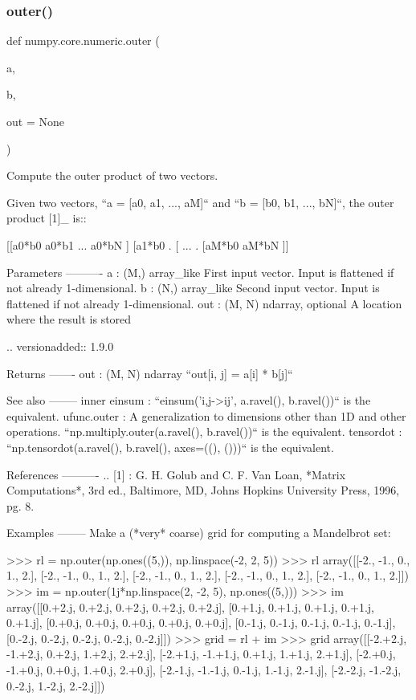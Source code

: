\subsubsection{\texorpdfstring{outer()}{outer()}}
{\footnotesize\ttfamily def numpy.\+core.\+numeric.\+outer (\begin{DoxyParamCaption}\item[{}]{a,  }\item[{}]{b,  }\item[{}]{out = {\ttfamily None} }\end{DoxyParamCaption})}

\begin{DoxyVerb}Compute the outer product of two vectors.

Given two vectors, ``a = [a0, a1, ..., aM]`` and
``b = [b0, b1, ..., bN]``,
the outer product [1]_ is::

  [[a0*b0  a0*b1 ... a0*bN ]
   [a1*b0    .
   [ ...          .
   [aM*b0            aM*bN ]]

Parameters
----------
a : (M,) array_like
    First input vector.  Input is flattened if
    not already 1-dimensional.
b : (N,) array_like
    Second input vector.  Input is flattened if
    not already 1-dimensional.
out : (M, N) ndarray, optional
    A location where the result is stored

    .. versionadded:: 1.9.0

Returns
-------
out : (M, N) ndarray
    ``out[i, j] = a[i] * b[j]``

See also
--------
inner
einsum : ``einsum('i,j->ij', a.ravel(), b.ravel())`` is the equivalent.
ufunc.outer : A generalization to dimensions other than 1D and other
              operations. ``np.multiply.outer(a.ravel(), b.ravel())``
              is the equivalent.
tensordot : ``np.tensordot(a.ravel(), b.ravel(), axes=((), ()))``
            is the equivalent.

References
----------
.. [1] : G. H. Golub and C. F. Van Loan, *Matrix Computations*, 3rd
         ed., Baltimore, MD, Johns Hopkins University Press, 1996,
         pg. 8.

Examples
--------
Make a (*very* coarse) grid for computing a Mandelbrot set:

>>> rl = np.outer(np.ones((5,)), np.linspace(-2, 2, 5))
>>> rl
array([[-2., -1.,  0.,  1.,  2.],
       [-2., -1.,  0.,  1.,  2.],
       [-2., -1.,  0.,  1.,  2.],
       [-2., -1.,  0.,  1.,  2.],
       [-2., -1.,  0.,  1.,  2.]])
>>> im = np.outer(1j*np.linspace(2, -2, 5), np.ones((5,)))
>>> im
array([[0.+2.j, 0.+2.j, 0.+2.j, 0.+2.j, 0.+2.j],
       [0.+1.j, 0.+1.j, 0.+1.j, 0.+1.j, 0.+1.j],
       [0.+0.j, 0.+0.j, 0.+0.j, 0.+0.j, 0.+0.j],
       [0.-1.j, 0.-1.j, 0.-1.j, 0.-1.j, 0.-1.j],
       [0.-2.j, 0.-2.j, 0.-2.j, 0.-2.j, 0.-2.j]])
>>> grid = rl + im
>>> grid
array([[-2.+2.j, -1.+2.j,  0.+2.j,  1.+2.j,  2.+2.j],
       [-2.+1.j, -1.+1.j,  0.+1.j,  1.+1.j,  2.+1.j],
       [-2.+0.j, -1.+0.j,  0.+0.j,  1.+0.j,  2.+0.j],
       [-2.-1.j, -1.-1.j,  0.-1.j,  1.-1.j,  2.-1.j],
       [-2.-2.j, -1.-2.j,  0.-2.j,  1.-2.j,  2.-2.j]])


\end{DoxyVerb}
